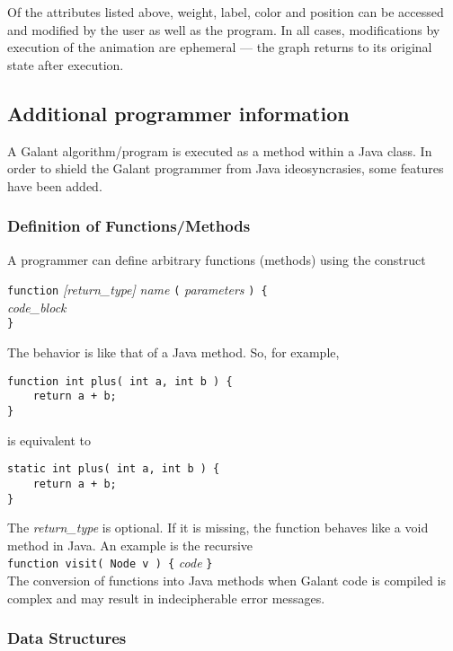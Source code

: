 Of the attributes listed above, weight, label, color and position can be
accessed and modified by the user as well as the program.
In all cases, modifications by execution of the animation are ephemeral --- the graph returns to its original state after execution.

\subsection{Additional programmer information}

A Galant algorithm/program is executed as a method within a Java class.
In order to shield the Galant programmer from Java ideosyncrasies,
some features have been added.

\subsubsection*{Definition of Functions/Methods}

A programmer can define arbitrary functions (methods) using the construct

\texttt{function} \textsl{[return\_type]} \textsl{name} \texttt{(}
 \textsl{parameters} \texttt{) \{} \\
 \hspace*{3em} \textsl{code\_block} \\
 \texttt{\}}

The behavior is like that of a Java method. So, for example,
\begin{verbatim}
function int plus( int a, int b ) {
    return a + b;
}
\end{verbatim}
is equivalent to
\begin{verbatim}
static int plus( int a, int b ) {
    return a + b;
}
\end{verbatim}

The \textsl{return\_type} is optional. If it is missing, the function behaves like
a \textsf{void} method in Java. An example is the recursive
\\
\texttt{function visit( Node v ) \{} \textsl{code} \texttt{\}}
\\
The conversion of functions into Java methods when Galant code is compiled
is complex and may result in indecipherable error messages.

\subsubsection*{Data Structures}

